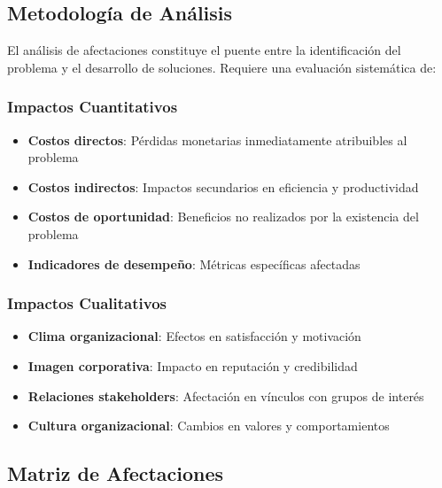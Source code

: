 \documentclass[12pt,letterpaper,oneside]{book}
\begin{document}
\subsection{Metodología de Análisis}

El análisis de afectaciones constituye el puente entre la identificación del problema y el desarrollo de soluciones. Requiere una evaluación sistemática de:

\subsubsection{Impactos Cuantitativos}

\begin{itemize}
\item \textbf{Costos directos}: Pérdidas monetarias inmediatamente atribuibles al problema
\item \textbf{Costos indirectos}: Impactos secundarios en eficiencia y productividad
\item \textbf{Costos de oportunidad}: Beneficios no realizados por la existencia del problema
\item \textbf{Indicadores de desempeño}: Métricas específicas afectadas
\end{itemize}

\subsubsection{Impactos Cualitativos}

\begin{itemize}
\item \textbf{Clima organizacional}: Efectos en satisfacción y motivación
\item \textbf{Imagen corporativa}: Impacto en reputación y credibilidad
\item \textbf{Relaciones stakeholders}: Afectación en vínculos con grupos de interés
\item \textbf{Cultura organizacional}: Cambios en valores y comportamientos
\end{itemize}

\subsection{Matriz de Afectaciones}
\end{document}
